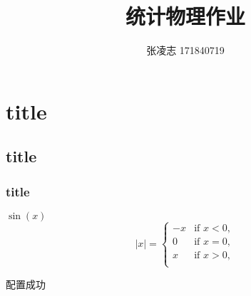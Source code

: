 \documentclass[UTF8,a4paper]{ctexart}
\title{统计物理作业}
\author{张凌志 171840719}
\begin{document}
 
	\maketitle
	\section{title}
	\subsection{title}
	\subsubsection{title}
	$\sin(x)$
	\[
	|x|=
	\begin{cases}
		-x&\text{if } x<0,\\
		0&\text{if } x=0,\\
		x&\text{if } x>0,\\
	\end{cases}
	\]
	\par{配置成功}
\end{document}
